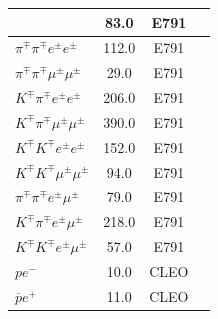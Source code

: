 \begin{longtable}{l|ccc}
& 83.0 & E791 & \cite{Aitala:2000kk}\\
\hline
$\pi{}^{\mp}\pi{}^{\mp}e^{\pm}e^{\pm}$ & 112.0 & E791 & \cite{Aitala:2000kk}\\
\hline
$\pi{}^{\mp}\pi{}^{\mp}\mu{}^{\pm}\mu{}^{\pm}$ & 29.0 & E791 & \cite{Aitala:2000kk}\\
\hline
$K^{\mp}\pi{}^{\mp}e^{\pm}e^{\pm}$ & 206.0 & E791 & \cite{Aitala:2000kk}\\
\hline
$K^{\mp}\pi{}^{\mp}\mu{}^{\pm}\mu{}^{\pm}$ & 390.0 & E791 & \cite{Aitala:2000kk}\\
\hline
$K^{\mp}K^{\mp}e^{\pm}e^{\pm}$ & 152.0 & E791 & \cite{Aitala:2000kk}\\
\hline
$K^{\mp}K^{\mp}\mu{}^{\pm}\mu{}^{\pm}$ & 94.0 & E791 & \cite{Aitala:2000kk}\\
\hline
$\pi{}^{\mp}\pi{}^{\mp}e^{\pm}\mu{}^{\pm}$ & 79.0 & E791 & \cite{Aitala:2000kk}\\
\hline
$K^{\mp}\pi{}^{\mp}e^{\pm}\mu{}^{\pm}$ & 218.0 & E791 & \cite{Aitala:2000kk}\\
\hline
$K^{\mp}K^{\mp}e^{\pm}\mu{}^{\pm}$ & 57.0 & E791 & \cite{Aitala:2000kk}\\
\hline
$pe^-$ & 10.0 & CLEO & \cite{Rubin:2009aa}\\
\hline
$\overline{p}e^+$ & 11.0 & CLEO & \cite{Rubin:2009aa}\\
\end{longtable}

\pagebreak


